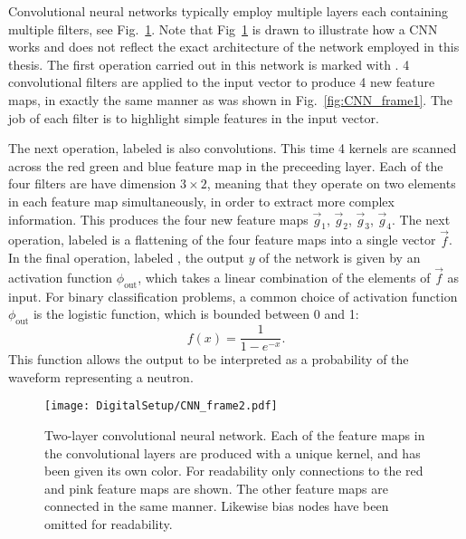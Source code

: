 \documentclass[main.tex]{subfiles}
\begin{document}
Convolutional neural networks typically employ multiple layers each containing multiple filters, see Fig.~\ref{fig:CNN_frame2}. Note that Fig~\ref{fig:CNN_frame2} is drawn to illustrate how a CNN works and does not reflect the exact architecture of the network employed in this thesis.  The first operation carried out in this network is marked with . 4 convolutional filters are applied to the input vector to produce 4 new feature maps, in exactly the same manner as was shown in Fig.~\ref{fig:CNN_frame1}. The job of  each filter is to highlight simple features in the input vector.

The next operation, labeled  is also convolutions. This time 4 kernels are scanned across the red green and blue feature map in the preceeding layer. Each of the four filters are have dimension $3\times2$, meaning that they operate on two elements in each feature map simultaneously, in order to extract more complex information. This produces the four new feature maps $\vec g_1$, $\vec g_2$, $\vec g_3$, $\vec g_4$. The next operation, labeled  is a flattening of the four feature maps into a single vector $\vec f$. In the final operation, labeled , the output $y$ of the network is given by an activation function $\phi_{\textrm{out}}$, which takes a linear combination of the elements of $\vec f$ as input. For binary classification problems, a common choice of activation function $\phi_{\textrm{out}}$ is the logistic function, which is bounded between 0 and 1:
\begin{equation}
	f(x) = \frac{1}{1-e^{-x}}.
\end{equation}
This function allows the output to be interpreted as a probability of the waveform representing a neutron.

\begin{figure}[ht!]
    \centering
        \texttt{[image: DigitalSetup/CNN\_frame2.pdf]}
        \caption[Two-layer convolutional neural network.]{Two-layer convolutional neural network. Each of the feature maps in the convolutional layers are produced with a unique kernel, and has been given its own color. For readability only connections to the red and pink feature maps are shown. The other feature maps are connected in the same manner. Likewise bias nodes have been omitted for readability.}
    \label{fig:CNN_frame2} 
\end{figure}
\end{document}
